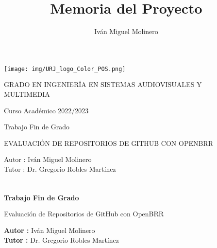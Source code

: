 \documentclass[a4paper, 12pt]{book}
\title{Memoria del Proyecto}
\author{Iván Miguel Molinero}
\begin{document}
\renewcommand{\refname}{Bibliografía}  %
\renewcommand{\appendixname}{Apéndice}


\begin{titlepage}
\begin{center}
\texttt{[image: img/URJ\_logo\_Color\_POS.png]}

\vspace{1.75cm}

\Large
GRADO EN INGENIERÍA EN SISTEMAS AUDIOVISUALES
Y MULTIMEDIA

\vspace{0.4cm}

\large
Curso Académico 2022/2023

\vspace{0.8cm}

Trabajo Fin de Grado

\vspace{2.5cm}

\LARGE
EVALUACIÓN DE REPOSITORIOS DE GITHUB CON OPENBRR

\vspace{4cm}

\large
Autor : Iván Miguel Molinero \\
Tutor : Dr. Gregorio Robles Martínez
\end{center}
\end{titlepage}

\newpage
\mbox{}
\thispagestyle{empty} %


\clearpage
{}
\chapter*{}

\vspace{-4cm}
\begin{center}
\LARGE
\textbf{Trabajo Fin de Grado}

\vspace{1cm}
\large
Evaluación de Repositorios de GitHub con OpenBRR

\vspace{1cm}
\large
\textbf{Autor :} Iván Miguel Molinero \\
\textbf{Tutor :} Dr. Gregorio Robles Martínez

\end{center}
\end{document}
